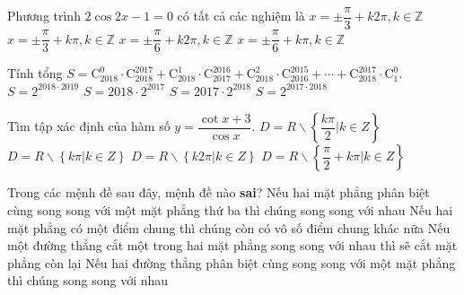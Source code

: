 \begin{ex}%
	Phương trình $2\cos 2x-1=0$ có tất cả các nghiệm là
	\choice
	{$x=\pm \dfrac{\pi}{3}+k2\pi,k\in \mathbb{Z}$}
	{$x=\pm \dfrac{\pi}{3}+k\pi,k\in \mathbb{Z}$}
	{$x=\pm \dfrac{\pi}{6}+k2\pi,k\in \mathbb{Z}$}
	{\True $x=\pm \dfrac{\pi}{6}+k\pi,k\in \mathbb{Z}$}
\end{ex}
\begin{ex}%
	Tính tổng $S=\mathrm{C}_{2018}^0\cdot\mathrm{C}_{2018}^{2017}+\mathrm{C}_{2018}^1\cdot\mathrm{C}_{2017}^{2016}+\mathrm{C}_{2018}^2\cdot\mathrm{C}_{2016}^{2015}+\cdots+\mathrm{C}_{2018}^{2017}\cdot\mathrm{C}_1^0$.
	\choice
	{$S=2^{2018\cdot2019} $}
	{\True $S=2018\cdot2^{2017} $}
	{$S=2017\cdot2^{2018} $}
	{$S=2^{2017\cdot2018} $}
\end{ex}
\begin{ex}%
	Tìm tập xác định của hàm số $y=\dfrac{\cot x+3}{\cos x}$.
	\choice
	{\True $D=R\backslash \left\{{\dfrac{k\pi}{2}\Big|k\in Z}\right\}$}
	{$D=R\backslash \left\{{k\pi |k\in Z}\right\} $}
	{$D=R\backslash \left\{{k2\pi \Big|k\in Z}\right\} $}
	{$D=R\backslash \left\{{\dfrac{\pi}{2}+k\pi |k\in Z}\right\} $}
\end{ex}
\begin{ex}%
	Trong các mệnh đề sau đây, mệnh đề nào \textbf{sai}?
	\choice
	{Nếu hai mặt phẳng phân biệt cùng song song với một mặt phẳng thứ ba thì chúng song song với nhau}
	{Nếu hai mặt phẳng có một điểm chung thì chúng còn có vô số điểm chung khác nữa}
	{Nếu một đường thẳng cắt một trong hai mặt phẳng song song với nhau thì sẽ cắt mặt phẳng còn lại}
	{\True Nếu hai đường thẳng phân biệt cùng song song với một mặt phẳng thì chúng song song với nhau}
\end{ex}
